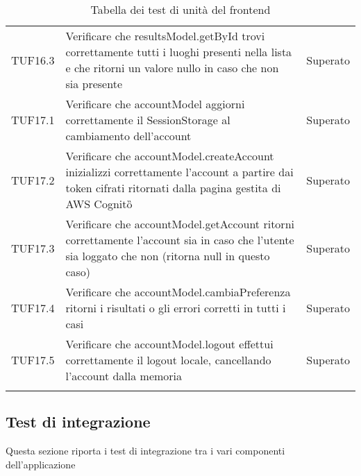 {\begin{longtable}{C{.3\freewidth} C{.5\freewidth} C{.3\freewidth}}
        TUF16.3 & Verificare che resultsModel.getById trovi correttamente tutti i luoghi presenti nella lista 
                e che ritorni un valore nullo in caso che non sia presente & Superato \\

        TUF17.1 & Verificare che accountModel aggiorni correttamente il SessionStorage al cambiamento dell'account & Superato \\

        TUF17.2 & Verificare che accountModel.createAccount inizializzi correttamente l'account a partire dai token cifrati 
                ritornati dalla pagina gestita di AWS Cognito\G{} & Superato \\

        TUF17.3 & Verificare che accountModel.getAccount ritorni correttamente l'account sia in caso 
                che l'utente sia loggato che non (ritorna null in questo caso) & Superato \\

        TUF17.4 & Verificare che accountModel.cambiaPreferenza ritorni i risultati o gli errori corretti in tutti i casi & Superato \\

        TUF17.5 & Verificare che accountModel.logout effettui correttamente il logout locale, 
                cancellando l'account dalla memoria & Superato \\

        \bottomrule
        \caption{Tabella dei test di unità del frontend}
        \end{longtable}
    }
 
\subsection{Test di integrazione}
    Questa sezione riporta i test di integrazione tra i vari componenti dell'applicazione

